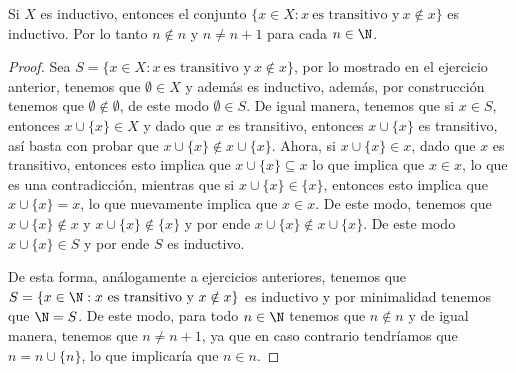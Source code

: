 \begin{exercise}[1.5]
  Si $X$ es inductivo, entonces el conjunto $\{x \in X : x \ \text{es transitivo y} \ x \notin x\}$ es inductivo. Por lo tanto $n \notin n$ y $n \neq n+1$ para cada $n \in \N$.
\end{exercise}
\begin{proof}
  Sea $S = \{x \in X : x \ \text{es transitivo y} \ x \notin x\}$, por lo mostrado en el ejercicio anterior, tenemos que $\emptyset \in X$ y además es inductivo, además, por construcción tenemos que $\emptyset \notin \emptyset$, de este modo $\emptyset \in S$. De igual manera, tenemos que si $x \in S$, entonces $x \cup \{x\} \in X$ y dado que $x$ es transitivo, entonces $x \cup \{x\}$ es transitivo, así basta con probar que $x \cup \{x\} \notin x \cup \{x\}$. Ahora, si $x \cup \{x\} \in x$, dado que $x$ es transitivo, entonces esto implica que $x \cup \{x\} \subseteq x$ lo que implica que $x \in x$, lo que es una contradicción, mientras que si $x \cup \{x\} \in \{x\}$, entonces esto implica que $x \cup \{x\} = x$, lo que nuevamente implica que $x \in x$. De este modo, tenemos que $x \cup \{x\} \notin x$ y $x \cup \{x\} \notin \{x\}$ y por ende $x \cup \{x\} \notin x \cup \{x\}$. De este modo $x \cup \{x\} \in S$ y por ende $S$ es inductivo.

  De esta forma, análogamente a ejercicios anteriores, tenemos que $S = \{x \in \N : x \ \text{es transitivo y} \ x \notin x\}$ es inductivo y por minimalidad tenemos que $\N = S$. De este modo, para todo $n \in \N$ tenemos que $n \notin n$ y de igual manera, tenemos que $n \neq n+1$, ya que en caso contrario tendríamos que $n = n \cup \{n\}$, lo que implicaría que $n \in n$.
\end{proof}